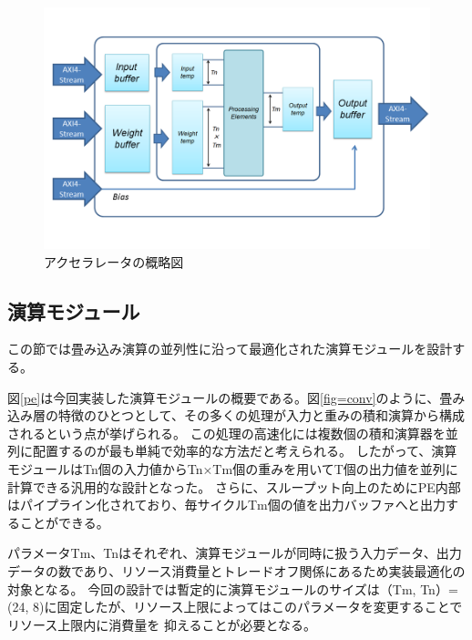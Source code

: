 \begin{figure}[ht]  
 \begin{center}   
   \includegraphics[bb=0 0 720 420, width=1.0\columnwidth]{img/hw.png}
  \caption{アクセラレータの概略図}
  \label{hw}  
 \end{center}  
\end{figure}

\subsection{演算モジュール}
この節では畳み込み演算の並列性に沿って最適化された演算モジュールを設計する。

図\ref{pe}は今回実装した演算モジュールの概要である。図\ref{fig=conv}のように、畳み込み層の特徴のひとつとして、その多くの処理が入力と重みの積和演算から構成されるという点が挙げられる。
この処理の高速化には複数個の積和演算器を並列に配置するのが最も単純で効率的な方法だと考えられる。
したがって、演算モジュールはTn個の入力値からTn×Tm個の重みを用いてT個の出力値を並列に計算できる汎用的な設計となった。
さらに、スループット向上のためにPE内部はパイプライン化されており、毎サイクルTm個の値を出力バッファへと出力することができる。

パラメータTm、Tnはそれぞれ、演算モジュールが同時に扱う入力データ、出力データの数であり、リソース消費量とトレードオフ関係にあるため実装最適化の対象となる。
今回の設計では暫定的に演算モジュールのサイズは（Tm, Tn）=(24, 8)に固定したが、リソース上限によってはこのパラメータを変更することでリソース上限内に消費量を
抑えることが必要となる。

